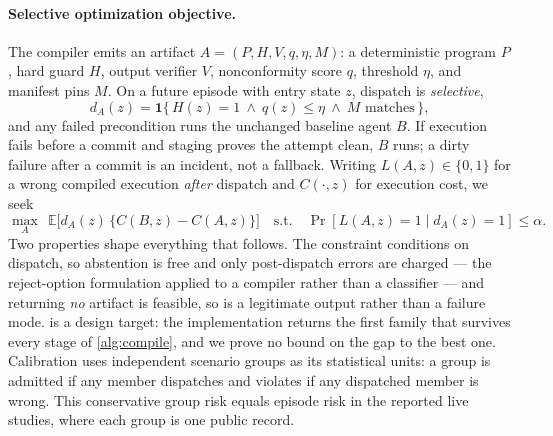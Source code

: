 \paragraph{Selective optimization objective.}
The compiler emits an artifact $A=(P,H,V,q,\eta,M)$: a deterministic program
$P$, hard guard $H$, output verifier $V$, nonconformity score $q$, threshold
$\eta$, and manifest pins $M$. On a future episode with entry state $z$,
dispatch is \emph{selective},
\begin{equation}
  d_A(z) = \mathbf{1}\{\,H(z)=1 \ \wedge\ q(z)\le\eta \ \wedge\ M \text{ matches}\,\},
  \label{eq:dispatch}
\end{equation}
and any failed precondition runs the unchanged baseline agent $B$. If execution
fails before a commit and staging proves the attempt clean, $B$ runs; a dirty
failure after a commit is an incident, not a fallback. Writing $L(A,z)\in\{0,1\}$
for a wrong compiled execution \emph{after} dispatch and $C(\cdot,z)$ for
execution cost, we seek
\begin{equation}
  \max_A\ \ \mathbb{E}\big[d_A(z)\,\{C(B,z)-C(A,z)\}\big]
  \quad\text{s.t.}\quad
  \Pr\!\left[L(A,z)=1 \mid d_A(z)=1\right] \le \alpha .
  \label{eq:objective}
\end{equation}
Two properties shape everything that follows. The constraint conditions on
dispatch, so abstention is free and only post-dispatch errors are charged ---
the reject-option formulation applied to a compiler rather than a classifier ---
and returning \emph{no} artifact is feasible, so \retire{}
is a legitimate output rather than a failure mode.  is a
design target: the implementation returns the first family that survives every
stage of \cref{alg:compile}, and we prove no bound on the gap to the best one.
Calibration uses independent scenario groups as its statistical units: a group
is admitted if any member dispatches and violates if any dispatched member is
wrong. This conservative group risk equals episode risk in the reported live
studies, where each group is one public record.

